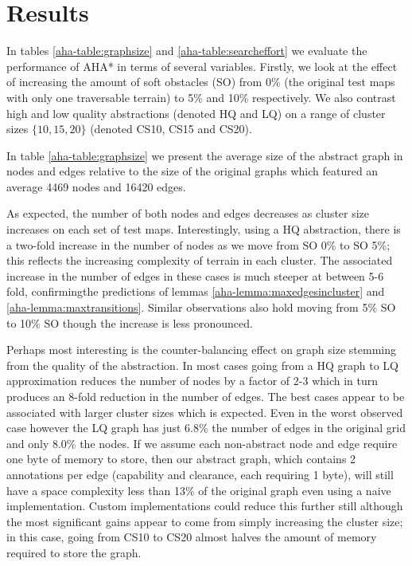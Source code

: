 \section{Results}
In tables \ref{aha-table:graphsize} and \ref{aha-table:searcheffort} we evaluate the performance of AHA* in terms of several variables. 
Firstly, we look at the effect of increasing the amount of soft obstacles (SO) from 0\% (the original test maps with only one traversable terrain) to 5\% and 10\% respectively. 
We also contrast high and low quality abstractions (denoted HQ and LQ) on a range of cluster sizes $\lbrace 10, 15, 20 \rbrace$ (denoted CS10, CS15 and CS20).
\par \indent
In table \ref{aha-table:graphsize} we present the average size of the abstract graph in nodes and edges relative to the size of the original graphs which featured an average 4469 nodes and 16420 edges. 

As expected, the number of both nodes and edges decreases as cluster size increases on each set of test maps. Interestingly, using a HQ abstraction, there is a two-fold increase in the number of nodes as we move from SO 0\% to SO 5\%; this reflects the increasing complexity of terrain in each cluster. 
The associated increase in the number of edges in these cases is much steeper at between 5-6 fold, confirmingthe predictions of lemmas \ref{aha-lemma:maxedgesincluster} and \ref{aha-lemma:maxtransitions}. Similar observations also hold moving from 5\% SO to 10\% SO though the increase is less pronounced.
\par \indent
Perhaps most interesting is the counter-balancing effect on graph size stemming from the quality of the abstraction. 
In most cases going from a HQ graph to  LQ approximation reduces the number of nodes by a factor of 2-3 which in turn produces an 8-fold reduction in the number of edges.
The best cases appear to be associated with larger cluster sizes which is expected. 
Even in the worst observed case however the LQ graph has just 6.8\% the number of edges in the original grid and only 8.0\% the nodes. 
If we assume each non-abstract node and edge require one byte of memory to store, then our abstract graph, which contains 2 annotations per edge (capability and clearance, each requiring 1 byte), will still have a space complexity less than 13\% of the original graph even using a naive implementation. 
Custom implementations could reduce this further still although the most significant gains appear to come from simply increasing the cluster size; in this case, going from CS10 to CS20 almost halves the amount of memory required to store the graph.
